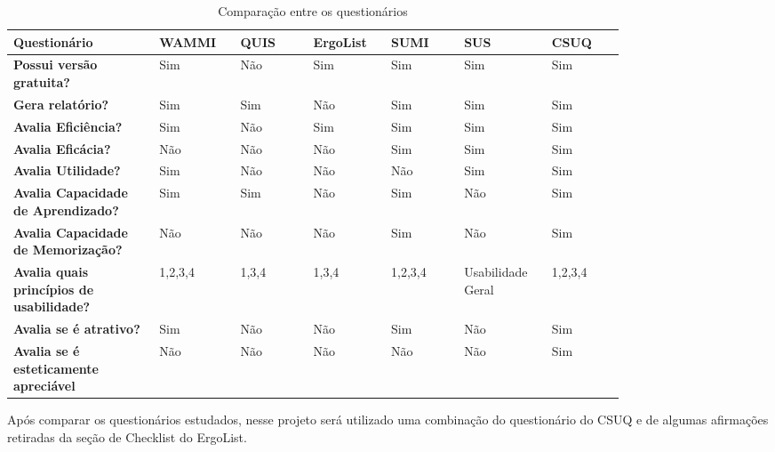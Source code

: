 \begin{table}[t]
\caption{Comparação entre os questionários}
\label{Rotulo}
  \begin{tabular}{p{0.20\linewidth}p{0.10\linewidth}p{0.10\linewidth}p{0.10\linewidth}p{0.10\linewidth}p{0.10\linewidth}p{0.10\linewidth}}
  \hline
  \textbf{Questionário} & WAMMI & QUIS & ErgoList & SUMI & SUS & CSUQ \\

  \hline

  \textbf{Possui versão gratuita?} & Sim & Não & Sim & Sim & Sim & Sim \\
  \textbf{Gera relatório?} & Sim & Sim & Não & Sim & Sim & Sim \\
  \textbf{Avalia Eficiência?} & Sim & Não & Sim & Sim & Sim & Sim \\
  \textbf{Avalia Eficácia?} & Não & Não & Não & Sim & Sim & Sim \\
  \textbf{Avalia Utilidade?} & Sim & Não & Não & Não & Sim & Sim \\
  \textbf{Avalia Capacidade de Aprendizado?} & Sim & Sim & Não & Sim & Não & Sim \\
  \textbf{Avalia Capacidade de Memorização?} & Não & Não & Não & Sim & Não & Sim \\
  \textbf{Avalia quais princípios de usabilidade?} & 1,2,3,4 & 1,3,4 & 1,3,4 & 1,2,3,4 & Usabilidade Geral & 1,2,3,4 \\
  \textbf{Avalia se é atrativo?} & Sim & Não & Não & Sim & Não & Sim \\
  \textbf{Avalia se é esteticamente apreciável} & Não & Não & Não & Não & Não & Sim \\

  \hline

  \end{tabular}
\end{table}
Após comparar os questionários estudados, nesse projeto será utilizado 
uma combinação do questionário do CSUQ e de algumas afirmações retiradas da seção de Checklist do ErgoList.